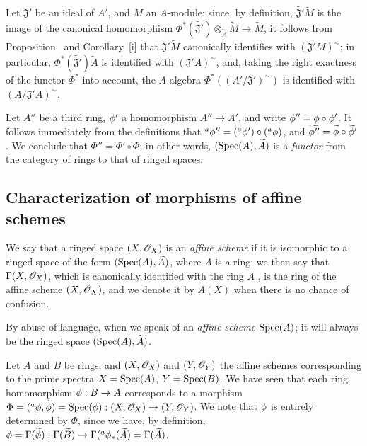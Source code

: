 \begin{env}[1.6.9]
\label{I.1.6.9}
Let $\mathfrak{J}'$ be an ideal of $A'$, and $M$ an $A$-module;
since, by definition, $\widetilde{\mathfrak{J}'}\widetilde{M}$ is the image of the canonical homomorphism $\Phi^*(\widetilde{\mathfrak{J}'})\otimes_{\widetilde{A}}\widetilde{M}\to\widetilde{M}$, it
follows from Proposition~ and Corollary~[i] that
$\widetilde{\mathfrak{J}'}\widetilde{M}$ canonically identifies with $(\mathfrak{J}' M)^\sim$;
in particular, $\Phi^*(\widetilde{\mathfrak{J}'})\widetilde{A}$ is identified with $(\mathfrak{J}' A)^\sim$, and, taking the right exactness of the functor $\Phi^*$ into account,
the $\widetilde{A}$-algebra $\Phi^*((A'/\mathfrak{J}')^\sim)$ is identified with $(A/\mathfrak{J}' A)^\sim$.
\end{env}

\begin{env}[1.6.10]
\label{I.1.6.10}
Let $A''$ be a third ring, $\phi'$ a homomorphism $A''\to A'$, and write $\phi''=\phi\circ\phi'$.
It follows immediately from the definitions that ${}^a\phi''=({}^a\phi')\circ({}^a\phi)$, and $\widetilde{\phi''}=\widetilde{\phi}\circ\widetilde{\phi'}$ . We conclude that $\Phi''=\Phi'\circ\Phi$;
in other words, $(\operatorname{Spec}(A),\widetilde{A})$ is a \emph{functor} from the category of rings to that of ringed spaces.
\end{env}

\subsection{Characterization of morphisms of affine schemes}
\label{subsection:I.1.7}

\begin{definition}[1.7.1]
\label{I.1.7.1}
We say that a ringed space $(X,\mathscr{O}_X)$ is an \emph{affine scheme} if it is isomorphic to a ringed space of the form $(\operatorname{Spec}(A),\widetilde{A})$, where $A$ is a ring;
we then say that $\Gamma(X,\mathscr{O}_X)$, which is canonically identified with the ring $A$ , is the ring of the affine scheme $(X,\mathscr{O}_X)$, and we denote it by $A(X)$ when there is no chance of confusion.
\end{definition}

By abuse of language, when we speak of an \emph{affine scheme $\operatorname{Spec}(A)$}; it will always be the ringed space $(\operatorname{Spec}(A),\widetilde{A})$.
\begin{env}[1.7.2]
\label{I.1.7.2}
Let $A$ and $B$ be rings, and $(X,\mathscr{O}_X)$ and $(Y,\mathscr{O}_Y)$ the affine schemes corresponding to the prime spectra $X=\operatorname{Spec}(A)$, $Y=\operatorname{Spec}(B)$.
We have seen  that each ring homomorphism $\vphi:B\to A$ corresponds to a morphism $\Phi=({}^a\vphi,\widetilde{\vphi})=\Spec(\vphi):(X,\sh{O}_X)\to(Y,\sh{O}_Y)$.
We note that $\phi$ is entirely determined by $\Phi$, since we have, by definition, $\vphi=\Gamma(\widetilde{\vphi}):\Gamma(\widetilde{B})\to\Gamma({}^a\vphi_*(\widetilde{A})=\Gamma(\widetilde{A})$.
\end{env}

